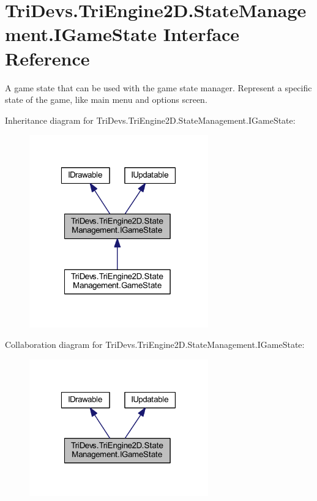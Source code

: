 \hypertarget{interface_tri_devs_1_1_tri_engine2_d_1_1_state_management_1_1_i_game_state}{\section{Tri\-Devs.\-Tri\-Engine2\-D.\-State\-Management.\-I\-Game\-State Interface Reference}
\label{interface_tri_devs_1_1_tri_engine2_d_1_1_state_management_1_1_i_game_state}
}


A game state that can be used with the game state manager. Represent a specific state of the game, like main menu and options screen.  




Inheritance diagram for Tri\-Devs.\-Tri\-Engine2\-D.\-State\-Management.\-I\-Game\-State\-:\nopagebreak
\begin{figure}[H]
\begin{center}
\leavevmode
\includegraphics[width=219pt]{interface_tri_devs_1_1_tri_engine2_d_1_1_state_management_1_1_i_game_state__inherit__graph}
\end{center}
\end{figure}


Collaboration diagram for Tri\-Devs.\-Tri\-Engine2\-D.\-State\-Management.\-I\-Game\-State\-:\nopagebreak
\begin{figure}[H]
\begin{center}
\leavevmode
\includegraphics[width=219pt]{interface_tri_devs_1_1_tri_engine2_d_1_1_state_management_1_1_i_game_state__coll__graph}
\end{center}
\end{figure}
